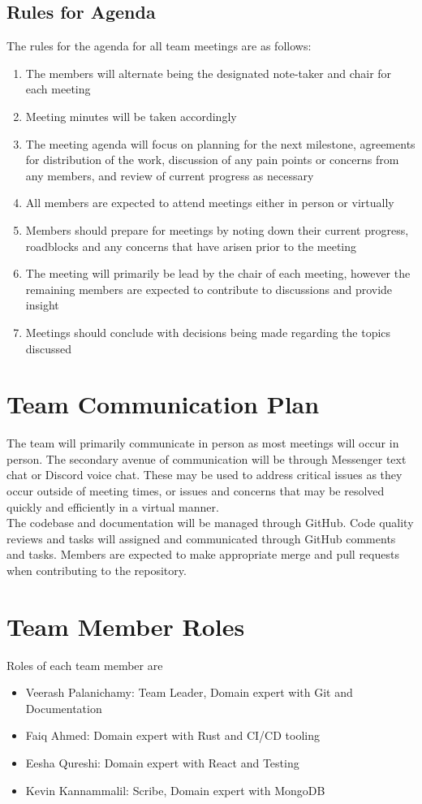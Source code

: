 \documentclass{article}
\begin{document}
\subsection{Rules for Agenda}
The rules for the agenda for all team meetings are as follows:
\begin{enumerate}
    \item  The members will alternate being the designated note-taker and chair for each meeting
    \item Meeting minutes will be taken accordingly 
    \item The meeting agenda will focus on planning for the next milestone, agreements for distribution of the work, discussion of any pain points or concerns from any members, and review of current progress as necessary
    \item All members are expected to attend meetings either in person or virtually
    \item Members should prepare for meetings by noting down their current progress, roadblocks and any concerns that have arisen prior to the meeting
    \item The meeting will primarily be lead by the chair of each meeting, however the remaining members are expected to contribute to discussions and provide insight
    \item Meetings should conclude with decisions being made regarding the topics discussed
\end{enumerate}

\section{Team Communication Plan}

	The team will primarily communicate in person as most meetings will occur in person. The secondary avenue of communication will be through Messenger text chat or Discord voice chat. These may be used to address critical issues as they occur outside of meeting times, or issues and concerns that may be resolved quickly and efficiently in a virtual manner. \\
	The codebase and documentation will be managed through GitHub. Code quality reviews and tasks will assigned and communicated through GitHub comments and tasks. Members are expected to make appropriate merge and pull requests when contributing to the repository.

\section{Team Member Roles}
Roles of each team member are
\begin{itemize}
    \item Veerash Palanichamy: Team Leader, Domain expert with Git and Documentation 
    \item Faiq Ahmed: Domain expert with Rust and CI/CD tooling
    \item Eesha Qureshi: Domain expert with React and Testing
    \item Kevin Kannammalil: Scribe, Domain expert with MongoDB
\end{itemize}
\end{document}
